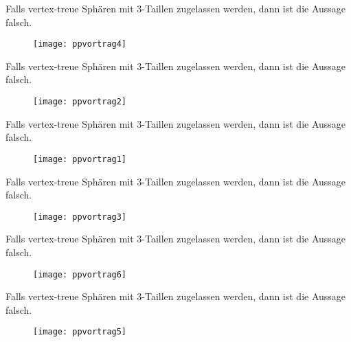\documentclass{beamer}
\begin{document}
\begin{frame}
Falls vertex-treue Sphären mit 3-Taillen zugelassen werden, dann ist die Aussage falsch. 
\begin{figure}[H]
\begin{center}
\texttt{[image: ppvortrag4]}
\end{center}
\end{figure}
\end{frame}
\begin{frame}
Falls vertex-treue Sphären mit 3-Taillen zugelassen werden, dann ist die Aussage falsch. 
\begin{figure}[H]
\begin{center}
\texttt{[image: ppvortrag2]}
\end{center}
\end{figure}
\end{frame}
\begin{frame}
Falls vertex-treue Sphären mit 3-Taillen zugelassen werden, dann ist die Aussage falsch. 
\begin{figure}[H]
\begin{center}
\texttt{[image: ppvortrag1]}
\end{center}
\end{figure}
\end{frame}
\begin{frame}
Falls vertex-treue Sphären mit 3-Taillen zugelassen werden, dann ist die Aussage falsch. 
\begin{figure}[H]
\begin{center}
\texttt{[image: ppvortrag3]}
\end{center}
\end{figure}
\end{frame}
\begin{frame}
Falls vertex-treue Sphären mit 3-Taillen zugelassen werden, dann ist die Aussage falsch. 
\begin{figure}[H]
\begin{center}
\texttt{[image: ppvortrag6]}
\end{center}
\end{figure}
\end{frame}
\begin{frame}
Falls vertex-treue Sphären mit 3-Taillen zugelassen werden, dann ist die Aussage falsch. 
\begin{figure}[H]
\begin{center}
\texttt{[image: ppvortrag5]}
\end{center}
\end{figure}
\end{frame}
\end{document}
